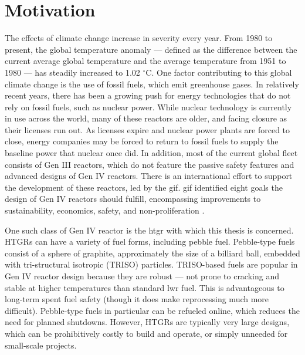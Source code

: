 \section{Motivation}

The effects of climate change increase in severity every year. From 1980 to present, the global temperature anomaly --- defined as the difference between the current average global temperature and the average temperature from 1951 to 1980 --- has steadily increased to 1.02 $^{\circ}$C.  One factor contributing to this global climate change is the use of fossil fuels, which emit greenhouse gases.  In relatively recent years, there has been a growing push for energy technologies that do not rely on fossil fuels, such as nuclear power.  While nuclear technology is currently in use across the world, many of these reactors are older, and facing closure as their licenses run out.  As licenses expire and nuclear power plants are forced to close, energy companies may be forced to return to fossil fuels to supply the baseline power that nuclear once did.  In addition, most of the current global fleet consists of Gen III reactors, which do not feature the passive safety features and advanced designs of Gen IV reactors.  There is an international effort to support the development of these reactors, led by the \acrfull{gif}.  \acrshort{gif} identified eight goals the design of Gen IV reactors should fulfill, encompassing improvements to sustainability, economics, safety, and non-proliferation \cite{noauthor_home_nodate-1}.

One such class of Gen IV reactor is the \acrfull{htgr} with which this thesis is concerned.  HTGRs can have a variety of fuel forms, including pebble fuel.  Pebble-type fuels consist of a sphere of graphite, approximately the size of a billiard ball, embedded with tri-structural isotropic (TRISO) particles.  TRISO-based fuels are popular in Gen IV reactor design because they are robust --- not prone to cracking and stable at higher temperatures than standard \acrfull{lwr} fuel.  This is advantageous to long-term spent fuel safety (though it does make reprocessing much more difficult).  Pebble-type fuels in particular can be refueled online, which reduces the need for planned shutdowns.  However, HTGRs are typically very large designs, which can be prohibitively costly to build and operate, or simply unneeded for small-scale projects.

